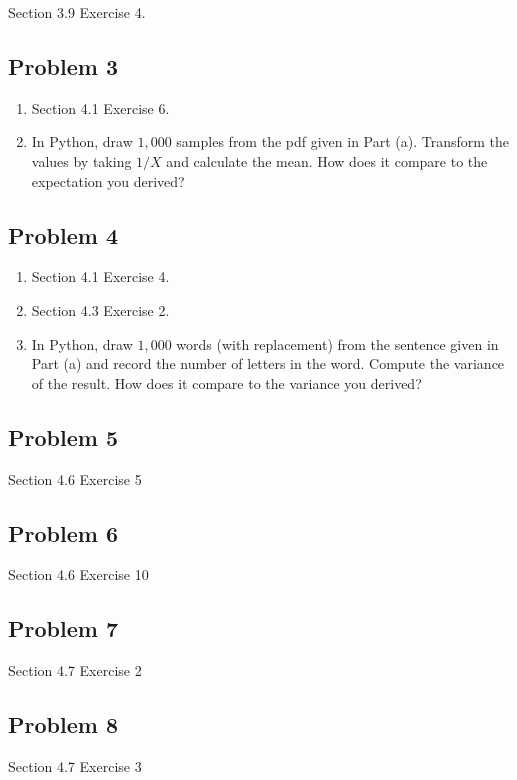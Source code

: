 \documentclass[12pt]{article}\usepackage[]{graphicx}\usepackage[]{color}
\begin{document}
Section 3.9 Exercise 4. \\


\subsection*{Problem 3}

\begin{enumerate}[label=(\alph*)]
  \item Section 4.1 Exercise 6.

  \item In Python, draw $1,000$ samples from the pdf given in Part (a).
  Transform the values by taking $1/X$ and calculate the mean. How does it
  compare to the expectation you derived?

\end{enumerate}


\subsection*{Problem 4}

\begin{enumerate}[label=(\alph*)]
  \item Section 4.1 Exercise 4.

  \item Section 4.3 Exercise 2.

  \item In Python, draw $1,000$ words (with replacement) from the sentence given
  in Part (a) and record the number of letters in the word. Compute the variance
  of the result. How does it compare to the variance you derived?

\end{enumerate}


\subsection*{Problem 5}

Section 4.6 Exercise 5 \\


\subsection*{Problem 6}

Section 4.6 Exercise 10 \\


\subsection*{Problem 7}

Section 4.7 Exercise 2 \\


\subsection*{Problem 8}

Section 4.7 Exercise 3 \\
\end{document}
